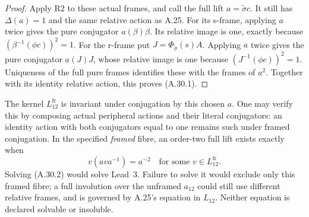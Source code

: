 \begin{proof}
Apply R2 to these actual frames, and call the full
lift \(a=\widetilde\sigma c\). It still has
\(\Delta(a)=1\) and the same relative action as
A.25. For its s-frame, applying \(a\) twice
gives the pure conjugator \(a(\beta)\beta\).
Its relative image is one, exactly because
\((\beta^{-1}(\phi c))^2=1\).
For the r-frame put \(J=\Phi_{\widetilde\sigma}(s)A\).
Applying \(a\) twice gives the pure conjugator
\(a(J)J\), whose relative image is one because
\((J^{-1}(\phi c))^2=1\). Uniqueness of the full
pure frames identifies these with the frames of
\(a^2\). Together with its identity relative
action, this proves (A.30.1).
\end{proof}

The kernel \(L_{12}^{\mathrm{fr}}\) is invariant
under conjugation by this chosen \(a\). One may
verify this by composing actual peripheral actions
and their literal conjugators: an identity action
with both conjugators equal to one remains such
under framed conjugation. In the specified
\emph{framed} fibre, an order-two full lift exists
exactly when
\[
             v(ava^{-1})=a^{-2}
             \quad\text{for some }v\in L_{12}^{\mathrm{fr}}.
 \tag{A.30.2}
\]
Solving (A.30.2) would solve Lead~3. Failure to
solve it would exclude only this framed fibre;
a full involution over the unframed \(a_{12}\)
could still use different relative frames, and
is governed by A.25's equation in \(L_{12}\).
Neither equation is declared solvable or insoluble.
